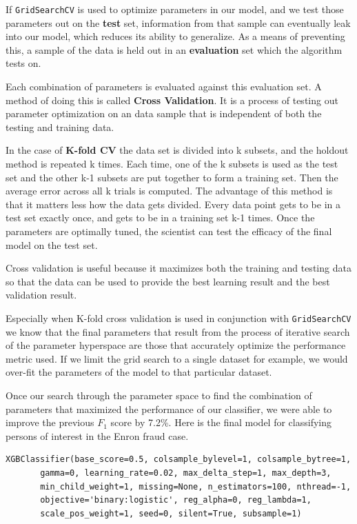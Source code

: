 \documentclass[twoside,openright,titlepage,numbers=noenddot,headinclude,%
               footinclude=true,cleardoublepage=empty,abstractoff,BCOR=5mm,%
               paper=a4,fontsize=11pt,ngerman,american]{scrreprt}
\numberwithin{theorem}{chapter}
\numberwithin{definition}{chapter}
\numberwithin{algorithm}{chapter}
\numberwithin{figure}{chapter}
\numberwithin{table}{chapter}
\numberwithin{equation}{chapter}
\begin{document}
If \texttt{GridSearchCV} is used to optimize parameters in our model, and we test those parameters out on the \textbf{test} set, information from that sample can eventually leak into our model, which reduces its ability to generalize. As a means of preventing this, a sample of the data is held out in an \textbf{evaluation} set which the algorithm tests on. 

Each combination of parameters is evaluated against this evaluation set. A method of doing this is called \textbf{Cross Validation}. It is a process of testing out parameter optimization on an data sample that is independent of both the testing and training data.

In the case of \textbf{K-fold CV} the data set is divided into k subsets, and the holdout method is repeated k times. Each time, one of the k subsets is used as the test set and the other k-1 subsets are put together to form a training set. Then the average error across all k trials is computed. The advantage of this method is that it matters less how the data gets divided. Every data point gets to be in a test set exactly once, and gets to be in a training set k-1 times. Once the parameters are optimally tuned, the scientist can test the efficacy of the final model on the test set. 

Cross validation is useful because it maximizes both the training and testing data so that the data can be used to provide the best learning result and the best validation result. 

Especially when K-fold cross validation is used in conjunction with \texttt{GridSearchCV} we know that the final parameters that result from the process of iterative search of the parameter hyperspace are those that accurately optimize the performance metric used. If we limit the grid search to a single dataset for example, we would over-fit the parameters of the model to that particular dataset.

Once our search through the parameter space to find the combination of parameters that maximized the performance of our classifier, we were able to improve the previous $F_1$ score by 7.2\%. Here is the final model for classifying persons of interest in the Enron fraud case.
\begin{verbatim}
XGBClassifier(base_score=0.5, colsample_bylevel=1, colsample_bytree=1,
       gamma=0, learning_rate=0.02, max_delta_step=1, max_depth=3,
       min_child_weight=1, missing=None, n_estimators=100, nthread=-1,
       objective='binary:logistic', reg_alpha=0, reg_lambda=1,
       scale_pos_weight=1, seed=0, silent=True, subsample=1)
\end{verbatim}
\end{document}
